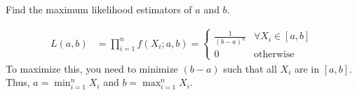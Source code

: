 \documentclass{article}
\begin{document}
\begin{probset}
\begin{prob}
\begin{subprobset}
        \begin{subprob}
            Find the maximum likelihood estimators of $a$ and $b$.

            \begin{soln}
                \begin{align*}
                    L(a, b) &= \prod_{i=1}^n f(X_i; a, b) = \begin{cases} \frac{1}{(b-a)^n} & \forall X_i \in [a, b] \\ 0 & \text{otherwise} \end{cases}
                \end{align*}
                To maximize this, you need to minimize $(b-a)$ such that all $X_i$ are in $[a, b]$. Thus, $a = \min_{i=1}^n X_i$ and $b = \max_{i=1}^n X_i$.
            \end{soln}
        \end{subprob}
    \end{subprobset}
\end{prob}
\end{probset}
\end{document}
